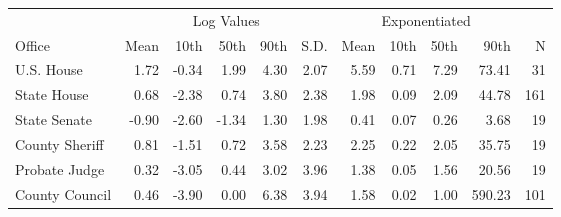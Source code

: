 
\begin{tabular}{lrrrrrrrrrr}
\toprule
\multicolumn{1}{c}{ } & \multicolumn{5}{c}{Log Values} & \multicolumn{4}{c}{Exponentiated} & \multicolumn{1}{c}{ } \\
\cmidrule(l{3pt}r{3pt}){2-6} \cmidrule(l{3pt}r{3pt}){7-10}
Office & Mean & 10th & 50th & 90th & S.D. & Mean & 10th & 50th & 90th & N\\
\midrule
U.S. House & 1.72 & -0.34 & 1.99 & 4.30 & 2.07 & 5.59 & 0.71 & 7.29 & 73.41 & 31\\
State House & 0.68 & -2.38 & 0.74 & 3.80 & 2.38 & 1.98 & 0.09 & 2.09 & 44.78 & 161\\
State Senate & -0.90 & -2.60 & -1.34 & 1.30 & 1.98 & 0.41 & 0.07 & 0.26 & 3.68 & 19\\
County Sheriff & 0.81 & -1.51 & 0.72 & 3.58 & 2.23 & 2.25 & 0.22 & 2.05 & 35.75 & 19\\
Probate Judge & 0.32 & -3.05 & 0.44 & 3.02 & 3.96 & 1.38 & 0.05 & 1.56 & 20.56 & 19\\
County Council & 0.46 & -3.90 & 0.00 & 6.38 & 3.94 & 1.58 & 0.02 & 1.00 & 590.23 & 101\\
\bottomrule
\end{tabular}
